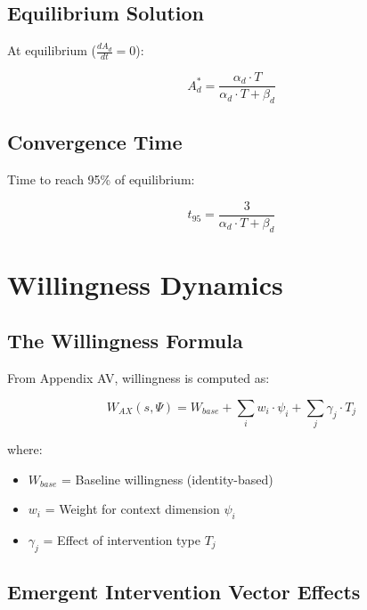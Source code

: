 \subsection{Equilibrium Solution}

At equilibrium ($\frac{dA_d}{dt} = 0$):

\begin{equation}
A_d^* = \frac{\alpha_d \cdot T}{\alpha_d \cdot T + \beta_d}
\label{eq:awareness-equilibrium}
\end{equation}

\subsection{Convergence Time}

Time to reach 95\% of equilibrium:

\begin{equation}
t_{95} = \frac{3}{\alpha_d \cdot T + \beta_d}
\label{eq:convergence-time}
\end{equation}


\section{Willingness Dynamics}
\label{sec:calc-willingness}

\subsection{The Willingness Formula}

From Appendix AV, willingness is computed as:

\begin{equation}
\boxed{
W_{AX}(s, \Psi) = W_{base} + \sum_{i} w_i \cdot \psi_i + \sum_{j} \gamma_j \cdot T_j
}
\label{eq:willingness}
\end{equation}

where:
\begin{itemize}
\item $W_{base}$ = Baseline willingness (identity-based)
\item $w_i$ = Weight for context dimension $\psi_i$
\item $\gamma_j$ = Effect of intervention type $T_j$
\end{itemize}

\subsection{Emergent Intervention Vector Effects}

